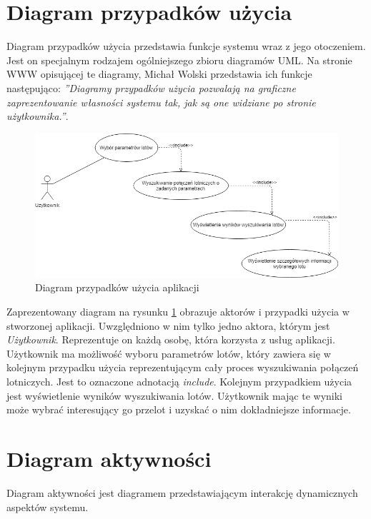 \documentclass[12pt, twoside]{report}
\begin{document}
\section{Diagram przypadków użycia}
Diagram przypadków użycia przedstawia funkcje systemu wraz z jego otoczeniem. Jest on specjalnym rodzajem ogólniejszego zbioru diagramów UML. Na stronie WWW opisującej te diagramy, Michał Wolski przedstawia ich funkcje następująco: \emph{''Diagramy przypadków użycia pozwalają na graficzne zaprezentowanie własności systemu tak, jak są one widziane po stronie użytkownika.''}\cite{uml}.
\begin{figure}[!ht]
\centering
\includegraphics[scale=0.60, keepaspectratio]{usecase_diagram.png}
\caption{Diagram przypadków użycia aplikacji}
\label{fig:usecase_diagram}
\end{figure}

\noindent Zaprezentowany diagram na rysunku \ref{fig:usecase_diagram} obrazuje aktorów i przypadki użycia w stworzonej aplikacji. Uwzględniono w nim tylko jedno aktora, którym jest \textit{Użytkownik}. Reprezentuje on każdą osobę, która korzysta z usług aplikacji. Użytkownik ma możliwość wyboru parametrów lotów, który zawiera się w kolejnym przypadku użycia reprezentującym cały proces wyszukiwania połączeń lotniczych. Jest to oznaczone adnotacją \textit{include}. Kolejnym przypadkiem użycia jest wyświetlenie wyników wyszukiwania lotów. Użytkownik mając te wyniki może wybrać interesujący go przelot i uzyskać o nim dokładniejsze informacje.
\section{Diagram aktywności} 
Diagram aktywności jest diagramem przedstawiającym interakcję dynamicznych aspektów systemu\cite{uml}.
\end{document}
